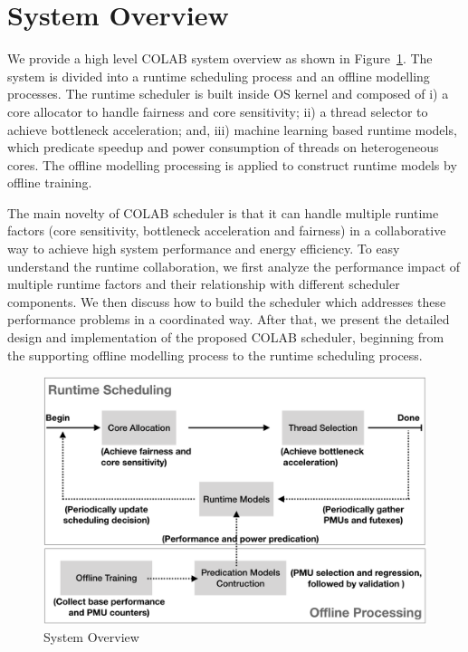 \section{System Overview}
We provide a high level COLAB system overview as shown in Figure~\ref{figure:f1}. The system is divided into a runtime scheduling process and an offline modelling processes. The runtime scheduler is built inside OS kernel and composed of i) a core allocator to handle fairness and core sensitivity; ii) a thread selector to achieve bottleneck acceleration; and, iii) machine learning based runtime models, which predicate speedup and power consumption of threads on heterogeneous cores. The offline modelling processing is applied to construct runtime models by offline training. 

The main novelty of COLAB scheduler is that it can handle multiple runtime factors (core sensitivity, bottleneck acceleration and fairness) in a collaborative way to achieve high system performance and energy efficiency. To easy understand the runtime collaboration, we first analyze the performance impact of multiple runtime factors and their relationship with different scheduler components. We then discuss how to build the scheduler which addresses these performance problems in a coordinated way. After that, we present the detailed design and implementation of the proposed COLAB scheduler, beginning from the supporting offline modelling process to the runtime scheduling process. 

\begin{figure}
\centering
\includegraphics[scale=0.27]{figures/overview.png}
\caption{System Overview}
\label{figure:f1}
\end{figure} 

